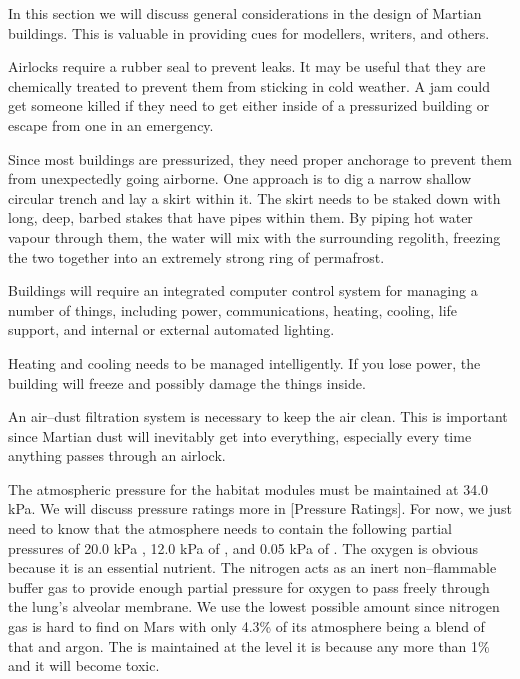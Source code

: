 

In this section we will discuss general considerations in the design of Martian buildings. This is valuable in providing cues for modellers, writers, and others.

Airlocks require a rubber seal to prevent leaks. It may be useful that they are chemically treated to prevent them from sticking in cold weather. A jam could get someone killed if they need to get either inside of a pressurized building or escape from one in an emergency.

Since most buildings are pressurized, they need proper anchorage to prevent them from unexpectedly going airborne. One approach is to dig a narrow shallow circular trench and lay a skirt within it. The skirt needs to be staked down with long, deep, barbed stakes that have pipes within them. By piping hot water vapour through them, the water will mix with the surrounding regolith, freezing the two together into an extremely strong ring of permafrost. 

Buildings will require an integrated computer control system for managing a number of things, including power, communications, heating, cooling, life support, and internal or external automated lighting.

Heating and cooling needs to be managed intelligently. If you lose power, the building will freeze and possibly damage the things inside.

An air--dust filtration system is necessary to keep the air clean. This is important since Martian dust will inevitably get into everything, especially every time anything passes through an airlock. 

The atmospheric pressure for the habitat modules must be maintained at 34.0 kPa. We will discuss pressure ratings more in [Pressure Ratings]. For now, we just need to know that the atmosphere needs to contain the following partial pressures of 20.0 kPa , 12.0 kPa of , and 0.05 kPa of . The oxygen is obvious because it is an essential nutrient. The nitrogen acts as an inert non--flammable buffer gas to provide enough partial pressure for oxygen to pass freely through the lung's alveolar membrane. We use the lowest possible amount since nitrogen gas is hard to find on Mars with only 4.3\% of its atmosphere being a blend of that and argon. The  is maintained at the level it is because any more than 1\% and it will become toxic.

